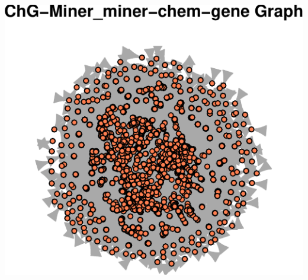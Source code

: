 \documentclass[
]{article}
\begin{document}
\includegraphics{lab5bio_files/figure-latex/unnamed-chunk-3-1.pdf}
\end{document}
